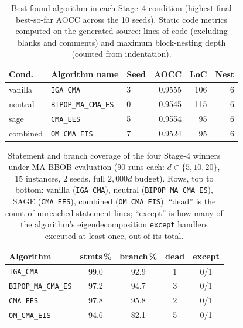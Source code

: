 \begin{table}[t]
\centering
\caption{Best-found algorithm in each Stage~4 condition (highest final best-so-far AOCC across the 10 seeds). Static code metrics computed on the generated source: lines of code (excluding blanks and comments) and maximum block-nesting depth (counted from indentation).}
\label{tab:phase4-winners}
\footnotesize
\setlength{\tabcolsep}{4pt}
\begin{tabular}{@{}l|llrrr@{}}
\toprule
\textbf{Cond.} & \textbf{Algorithm name} & \textbf{Seed} & \textbf{AOCC} & \textbf{LoC} & \textbf{Nest} \\
\midrule
vanilla  & \texttt{IGA\_CMA}          & 3 & 0.9555 & 106 & 6 \\
neutral  & \texttt{BIPOP\_MA\_CMA\_ES} & 0 & 0.9545 & 115 & 6 \\
sage     & \texttt{CMA\_EES}          & 5 & 0.9554 &  95 & 6 \\
combined & \texttt{OM\_CMA\_EIS}       & 7 & 0.9524 &  95 & 6 \\
\bottomrule
\end{tabular}
\end{table}

\begin{table}[t]
\centering
\small
\caption{Statement and branch coverage of the four Stage-4 winners under MA-BBOB evaluation (90 runs each: $d \in \{5,10,20\}$, 15 instances, 2 seeds, full $2{,}000d$ budget). Rows, top to bottom: vanilla (\texttt{IGA\_CMA}), neutral (\texttt{BIPOP\_MA\_CMA\_ES}), SAGE (\texttt{CMA\_EES}), combined (\texttt{OM\_CMA\_EIS}). ``dead'' is the count of unreached statement lines; ``except'' is how many of the algorithm's eigendecomposition \texttt{except} handlers executed at least once, out of its total.}
\label{tab:winner-coverage}
\setlength{\tabcolsep}{5pt}
\begin{tabular}{@{}lcccc@{}}
\toprule
\textbf{Algorithm} & \textbf{stmts\,\%} & \textbf{branch\,\%} & \textbf{dead} & \textbf{except} \\
\midrule
\texttt{IGA\_CMA}            & 99.0 & 92.9 & 1 & 0/1 \\
\texttt{BIPOP\_MA\_CMA\_ES}   & 97.2 & 94.7 & 3 & 0/1 \\
\texttt{CMA\_EES}            & 97.8 & 95.8 & 2 & 0/1 \\
\texttt{OM\_CMA\_EIS}         & 94.6 & 82.1 & 5 & 0/1 \\
\bottomrule
\end{tabular}
\end{table}

